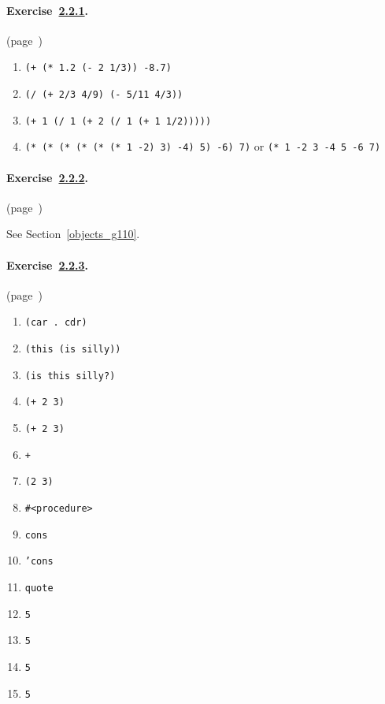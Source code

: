 
\label{answers_h0}




  

\paragraph{Exercise \hyperref[start_g7]{2.2.1}. }(page \pageref{start_s34})

   
 
 \begin{enumerate}[\it a. ]
\item \texttt{(+ (* 1.2 (- 2 1/3)) -8.7)} \item \texttt{(/ (+ 2/3 4/9) (- 5/11 4/3))} \item \texttt{(+ 1 (/ 1 (+ 2 (/ 1 (+ 1 1/2)))))} \item \texttt{(* (* (* (* (* (* 1 -2) 3) -4) 5) -6) 7)} or       \texttt{(* 1 -2 3 -4 5 -6 7)} \end{enumerate}
 


\paragraph{Exercise \hyperref[start_g8]{2.2.2}. }(page \pageref{start_s35})

  See Section \ref{objects_g110}. 


\paragraph{Exercise \hyperref[start_g9]{2.2.3}. }(page \pageref{start_s36})

   
 
 \begin{enumerate}[\it a. ]
\item \texttt{(car . cdr)} \item \texttt{(this (is silly))} \item \texttt{(is this silly?)} \item \texttt{(+ 2 3)} \item \texttt{(+ 2 3)} \item \texttt{+} \item \texttt{(2 3)} \item \texttt{\#{}\textless{}procedure\textgreater{}} \item \texttt{cons} \item \texttt{'cons} \item \texttt{quote} \item \texttt{5} \item \texttt{5} \item \texttt{5} \item \texttt{5} \end{enumerate}
 


